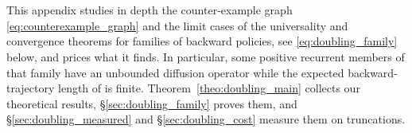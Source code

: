 \section{\appendixHtitle}\label{app:doubling}

This appendix studies in depth the counter-example graph
\eqref{eq:counterexample_graph} and the limit cases of the universality and convergence
theorems for families of backward policies, see \eqref{eq:doubling_family} below, and prices
what it finds. In particular, some positive recurrent members of that family have an unbounded
diffusion operator while the expected backward-trajectory length of
\citet{morozov2025revisiting} is finite. Theorem~\ref{theo:doubling_main} collects our
theoretical results, \S\ref{sec:doubling_family} proves them, and
\S\ref{sec:doubling_measured} and \S\ref{sec:doubling_cost} measure them on truncations.

